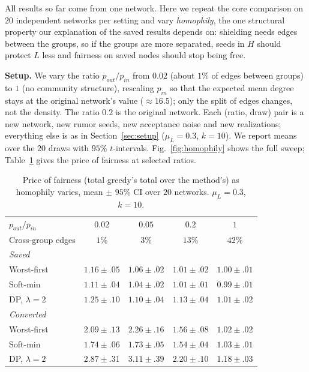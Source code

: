 
All results so far come from one network. Here we repeat the core comparison on $20$ independent networks per setting and vary \emph{homophily}, the one structural property our explanation of the saved results depends on: shielding needs edges between the groups, so if the groups are more separated, seeds in $H$ should protect $L$ less and fairness on saved nodes should stop being free.

\textbf{Setup.} We vary the ratio $p_{out}/p_{in}$ from $0.02$ (about $1\%$ of edges between groups) to $1$ (no community structure), rescaling $p_{in}$ so that the expected mean degree stays at the original network's value ($\approx 16.5$); only the split of edges changes, not the density. The ratio $0.2$ is the original network. Each (ratio, draw) pair is a new network, new rumor seeds, new acceptance noise and new realizations; everything else is as in Section~\ref{sec:setup} ($\mu_L=0.3$, $k=10$). We report means over the $20$ draws with $95\%$ $t$-intervals. Fig.~\ref{fig:homophily} shows the full sweep; Table~\ref{tab:homophily} gives the price of fairness at selected ratios.

\begin{table}[H]
\centering
\footnotesize
\setlength{\tabcolsep}{2pt}
\begin{tabular}{lcccc}
\hline
$p_{out}/p_{in}$ & $0.02$ & $0.05$ & $0.2$ & $1$ \\
Cross-group edges & $1\%$ & $3\%$ & $13\%$ & $42\%$ \\
\hline
\multicolumn{5}{l}{\emph{Saved}} \\
Worst-first & $1.16{\pm}.05$ & $1.06{\pm}.02$ & $1.01{\pm}.02$ & $1.00{\pm}.01$ \\
Soft-min & $1.11{\pm}.04$ & $1.04{\pm}.02$ & $1.01{\pm}.01$ & $0.99{\pm}.01$ \\
DP, $\lambda=2$ & $1.25{\pm}.10$ & $1.10{\pm}.04$ & $1.13{\pm}.04$ & $1.01{\pm}.02$ \\
\hline
\multicolumn{5}{l}{\emph{Converted}} \\
Worst-first & $2.09{\pm}.13$ & $2.26{\pm}.16$ & $1.56{\pm}.08$ & $1.02{\pm}.02$ \\
Soft-min & $1.74{\pm}.06$ & $1.73{\pm}.05$ & $1.54{\pm}.04$ & $1.03{\pm}.01$ \\
DP, $\lambda=2$ & $2.87{\pm}.31$ & $3.11{\pm}.39$ & $2.20{\pm}.10$ & $1.18{\pm}.03$ \\
\hline
\end{tabular}
\caption{Price of fairness (total greedy's total over the method's) as homophily varies, mean $\pm$ $95\%$ CI over $20$ networks. $\mu_L=0.3$, $k=10$.}
\label{tab:homophily}
\end{table}

